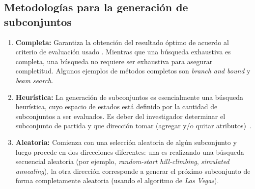 \subsection{Metodolog\'ias para la generaci\'on de subconjuntos}
\begin{enumerate}
\item \textbf{Completa:}  Garantiza la obtenci\'on del resultado \'optimo de acuerdo al criterio de evaluaci\'on usado . Mientras que una b\'usqueda exhaustiva es completa, una b\'usqueda no requiere ser exhaustiva para asegurar completitud. Algunos ejemplos de m\'etodos completos son \textit{branch and bound} y \textit{beam search}.
\item \textbf{Heur\'istica:} La generaci\'on de subconjuntos es esencialmente una b\'usqueda heur\'istica, cuyo espacio de estados est\'a definido por la cantidad de subconjuntos a ser evaluados. Es deber del investigador determinar el subconjunto de partida y que direcci\'on tomar (agregar y/o quitar atributos)~\cite{liuyu}.  
\item \textbf{Aleatoria:} Comienza con una selecci\'on aleatoria de alg\'un subconjunto y luego procede en dos direcciones diferentes: una es realizando una b\'usqueda secuencial aleatoria (por ejemplo, \textit{random-start hill-climbing}, \textit{simulated annealing}), la otra direcci\'on corresponde a generar el pr\'oximo subconjunto de forma completamente aleatoria (usando el algoritmo de \textit{Las Vegas}). 
\end{enumerate}
